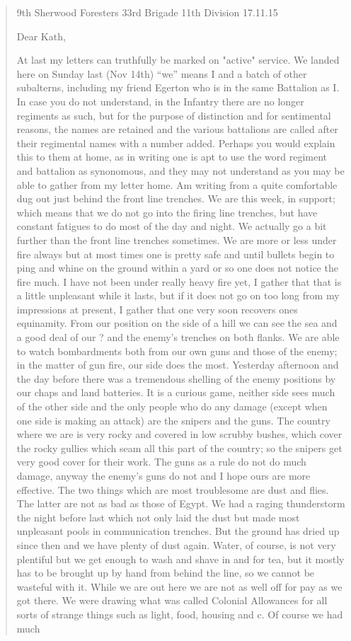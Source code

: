 \begin{quotation}
\begin{raggedleft}
9th Sherwood Foresters
33rd Brigade
11th Division 17.11.15
\end{raggedleft}

Dear Kath,

At last my letters can truthfully be marked on "active" service. We landed here on Sunday last (Nov 14th) ``we'' means I and a batch of other subalterns, including my friend Egerton who is in the same Battalion as I. In case you do not understand, in the Infantry there are no longer regiments as such, but for the purpose of distinction and for sentimental reasons, the names are retained and the various battalions are called after their regimental names with a number added. Perhaps you would explain this to them at home, as in writing one is apt to use the word regiment and battalion as synonomous, and they may not understand as you may be able to gather from my letter home. Am writing from a quite comfortable dug out just behind the front line trenches. We are this week, in support; which means that we do not go into the firing line trenches, but have constant fatigues to do most of the day and night. We actually go a bit further than the front line trenches sometimes. We are more or less under fire always but at most times one is pretty safe and until bullets begin to ping and whine on the ground within a yard or so one does not notice the fire much. I have not been under really heavy fire yet, I gather that that is a little unpleasant while it lasts, but if it does not go on too long from my impressions at present, I gather that one very soon recovers ones equinamity. From our position on the side of a hill we can see the sea and a good deal of our ? and the enemy's trenches on both flanks. We are able to watch bombardments both from our own guns and those of the enemy; in the matter of gun fire, our side does the most. Yesterday afternoon and the day before there was a tremendous shelling of the enemy positions by our chaps and land batteries. It is a curious game, neither side sees much of the other side and the only people who do any damage (except when one side is making an attack) are the snipers and the guns. The country where we are is very rocky and covered in low scrubby bushes, which cover the rocky gullies which seam all this part of the country; so the snipers get very good cover for their work. The guns as a rule do not do much damage, anyway the enemy's guns do not and I hope ours are more effective. The two things which are most troublesome are dust and flies. The latter are not as bad as those of Egypt. We had a raging thunderstorm the night before last which not only laid the dust but made most unpleasant pools in communication trenches. But the ground has dried up since then and we have plenty of dust again. Water, of course, is not very plentiful but we get enough to wash and shave in and for tea, but it mostly has to be brought up by hand from behind the line, so we cannot be wasteful with it. While we are out here we are not as well off for pay as we got there. We were drawing what was called Colonial Allowances for all sorts of strange things such as light, food, housing and c. Of course we had much 
\end{quotation}
